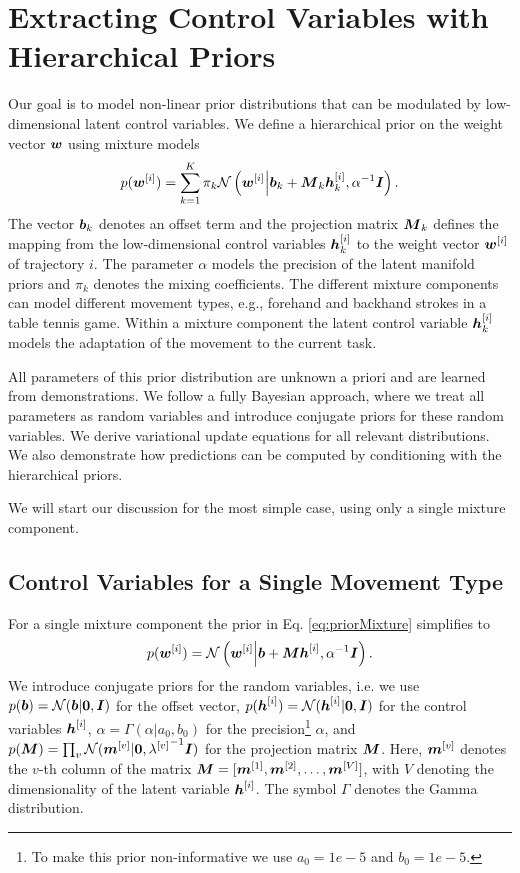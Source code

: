 \section{Extracting Control Variables with Hierarchical Priors}

Our goal is to model non-linear prior distributions that can be modulated by low-dimensional latent control variables. 
We define a hierarchical prior on the weight vector $\boldsymbol{w} $ using mixture models 
\begin{align}\label{eq:priorMixture}
  p(\boldsymbol{w}^{[i]} ) = \sum_{k=1}^K \pi_k \mathcal{N}\left(\boldsymbol{w}^{[i]} \middle|\boldsymbol{b}_k  + \boldsymbol{M}_k  \boldsymbol{h}^{[i]}_k , \alpha^{-1}
      \boldsymbol{I}\right).
\end{align}
The vector $\boldsymbol{b}_k $ denotes an offset term and the projection matrix
$\boldsymbol{M}_k $ defines the mapping from the low-dimensional control variables 
$\boldsymbol{h}^{[i]}_k $ to the weight vector $\boldsymbol{w}^{[i]} $ of trajectory $i$. The parameter
$\alpha$ models the precision of the latent manifold priors 
and $\pi_k$ denotes the mixing coefficients.
The different mixture components can model different movement types, e.g., forehand and backhand strokes in a table tennis game. 
Within a mixture component the latent control variable $\boldsymbol{h}^{[i]}_k $ models the adaptation of 
the movement to the current task.

All parameters of this prior distribution are unknown a priori and are learned from demonstrations.  
We follow a fully Bayesian approach, where 
we treat all parameters as random variables and introduce conjugate priors for these random variables. We 
derive variational update equations for all relevant distributions. We also demonstrate how 
predictions can be computed by conditioning with the hierarchical priors. 

We will start our discussion for the most simple case, 
using only a single mixture component. 







\subsection{Control Variables for a Single Movement Type}\label{sec:latentSingle}

For a single mixture component the prior in Eq. \eqref{eq:priorMixture} simplifies to 
\begin{align*}
p(\boldsymbol{w}^{[i]} ) = \mathcal{N}\left(\boldsymbol{w}^{[i]} \middle|\boldsymbol{b}  +\boldsymbol{M}  \boldsymbol{h}^{[i]} , \alpha^{-1} \boldsymbol{I}\right).
\end{align*}
We introduce conjugate priors for the random variables, i.e. 
we use $p(\boldsymbol{b} ) = \mathcal{N}(\boldsymbol{b} |\boldsymbol{0},\boldsymbol{I})$ for the offset vector, 
 $p(\boldsymbol{h}^{[i]} )= \mathcal{N}(\boldsymbol{h}^{[i]} |\boldsymbol{0},\boldsymbol{I})$ for the control variables $\boldsymbol{h}^{[i]} $, 
 $\alpha=\Gamma(\alpha|a_0,b_0)$ for the precision\footnote{To make this prior non-informative we use $a_0=1e-5$ and $b_0=1e-5$.} $\alpha$, 
 and $p(\boldsymbol{M} ) = \prod_v \mathcal{N}( \boldsymbol{m}^{[v]}  | \boldsymbol{0}, {\lambda^{[v]}} ^{-1} \boldsymbol{I})$ for the projection matrix $\boldsymbol{M} $.
Here, $ \boldsymbol{m}^{[v]} $ denotes the $v$-th column of the matrix $\boldsymbol{M} =[ \boldsymbol{m}^{[1]} ,  \boldsymbol{m}^{[2]} , \dots,  \boldsymbol{m}^{[V]} ]$, 
with $V$ denoting the dimensionality of the latent variable $\boldsymbol{h}^{[i]} $.
The symbol $\Gamma$ denotes the Gamma distribution. 

